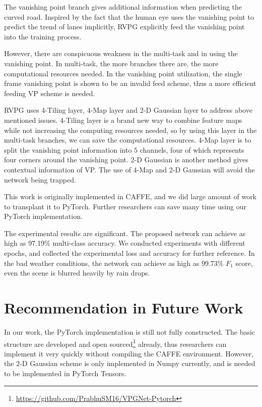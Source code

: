 \begin{spacing}{1.5}
The vanishing point branch gives additional information when predicting the curved road. Inspired by the fact that the human eye uses the vanishing point to predict the trend of lanes implicitly, RVPG explicitly feed the vanishing point into the training process.

However, there are conspicuous weakness in the multi-task and in using the vanishing point. In multi-task, the more branches there are, the more computational resources needed. In the vanishing point utilization, the single frame vanishing point is shown to be an invalid feed scheme, thus a more efficient feeding VP scheme is needed.

RVPG uses 4-Tiling layer, 4-Map layer and 2-D Gaussian layer to address above mentioned issues. 4-Tiling layer is a brand new way to combine feature maps while not increasing the computing resources needed, so by using this layer in the multi-task branches, we can save the computational resources. 4-Map layer is to split the vanishing point information into $5$ channels, four of which represents four corners around the vanishing point. 2-D Gaussian is another method gives contextual information of VP. The use of 4-Map and 2-D Gaussian will avoid the network being trapped.

This work is originally implemented in CAFFE, and we did large amount of work to transplant it to PyTorch. Further researchers can save many time using our PyTorch implementation.

The experimental results are significant. The proposed network can achieve as high as 97.19\% multi-class accuracy. We conducted experiments with different epochs, and collected the experimental loss and accuracy for further reference. In the bad weather conditions, the network can achieve as high as 99.73\% $F_1$ score, even the scene is blurred heavily by rain drops.

\section{Recommendation in Future Work}


In our work, the PyTorch implementation is still not fully constructed. The basic structure are developed and open sourced\footnote{\url{https://github.com/PrabhuSM16/VPGNet-Pytorch}} already, thus researchers can implement it very quickly without compiling the CAFFE environment. However, the 2-D Gaussian scheme is only implemented in Numpy currently, and is needed to be implemented in PyTorch Tensors. 


\end{spacing}
